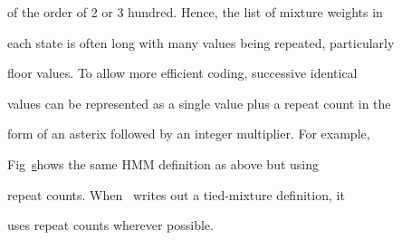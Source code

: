 of the order of 2 or 3 hundred.  Hence, the list of mixture weights in


each state is often long with many values being repeated, particularly


floor values.  To allow more efficient coding, successive identical


values can be represented as a single value plus a repeat count in the


form of an asterix followed by an integer multiplier.  For example,


Fig~\href{f:tmixhmm2} shows the same HMM definition as above but using


repeat counts.  When \HTK\ writes out a tied-mixture definition, it


uses repeat counts wherever possible.  










